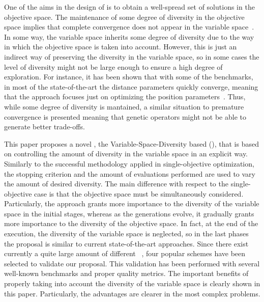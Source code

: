 One of the aims in the design of \MOEAS{} is to obtain a well-spread set of solutions in the objective space.
%
The maintenance of some degree of diversity in the objective space implies that complete convergence 
does not appear in the variable space~\cite{Joel:GDE3_CEC09}.
%
In some way, the variable space inherits some degree of diversity due to the way in which the objective space is taken into account. 
%
However, this is just an indirect way of preserving the diversity in the variable space, so in some cases the level of diversity might not be large enough to ensure
a high degree of exploration.
%
For instance, it has been shown that with some of the \WFG{} benchmarks, in most of the state-of-the-art \MOEAS{} the distance parameters quickly converge, meaning that the approach
focuses just on optimizing the position parameters~\cite{Joel:GDE3_CEC09}.
%
Thus, while some degree of diversity is mantained, a similar situation to premature convergence is presented
meaning that genetic operators might not be able to generate better trade-offs. 
%

This paper proposes a novel \MOEA{}, the Variable-Space-Diversity based \MOEA{} (\VSDMOEA{}), that is based on controlling the amount of diversity in the variable space in an explicit way.
%
Similarly to the successful methodology applied in single-objective optimization, the stopping criterion and the amount of evaluations performed are used
to vary the amount of desired diversity.
%
The main difference with respect to the single-objective case is that the objective space must be simultaneously considered.
%
Particularly, the approach grants more importance to the diversity of the variable space in the initial stages, whereas 
as the generations evolve, it gradually grants more importance to the diversity of the objective space.
%
In fact, at the end of the execution, the diversity of the variable space is neglected, so in the last phases the proposal is similar to current state-of-the-art approaches.
%
Since there exist currently a quite large amount of different \MOEAS{}~\cite{Joel:MOEA_APPLICATIONS_BOOK_KCTAN}, four popular schemes have been selected to
validate our proposal.
%
%
%
%
%
This validation has been performed with several well-known benchmarks and proper quality metrics.
%
The important benefits of properly taking into account the diversity of the variable space is
clearly shown in this paper.
%
Particularly, the advantages are clearer in the most complex problems.

